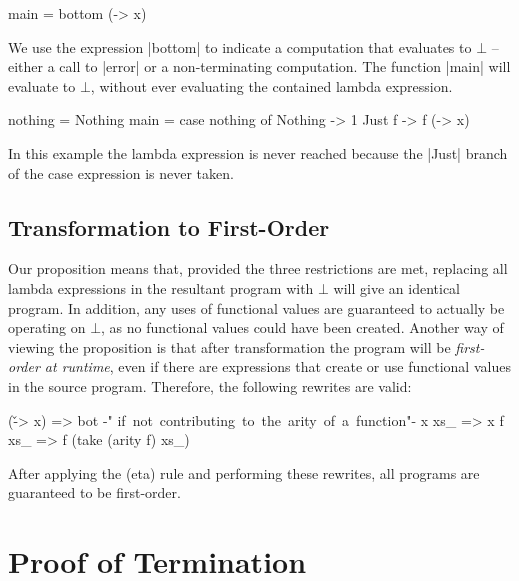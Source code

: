 \documentclass[preprint]{sigplanconf}
\begin{document}
\begin{example}
\begin{code}
main = bottom (\x -> x)
\end{code}

We use the expression |bottom| to indicate a computation that evaluates to $\bot{}$ -- either a call to |error| or a non-terminating computation. The function |main| will evaluate to $\bot{}$, without ever evaluating the contained lambda expression.
\end{example}

\begin{example}
\begin{onepage}
\begin{code}
nothing = Nothing
main = case  nothing of
             Nothing  -> 1
             Just f   -> f (\x -> x)
\end{code}
\end{onepage}

In this example the lambda expression is never reached because the |Just| branch of the case expression is never taken.
\end{example}

\subsection{Transformation to First-Order}
\label{sec:consequences}

Our proposition means that, provided the three restrictions are met, replacing all lambda expressions in the resultant program with $\bot{}$ will give an identical program. In addition, any uses of functional values are guaranteed to actually be operating on $\bot{}$, as no functional values could have been created. Another way of viewing the proposition is that after transformation the program will be \textit{first-order at runtime}, even if there are expressions that create or use functional values in the source program. Therefore, the following rewrites are valid:

\ignore\begin{code}
(\v -> x)  => bot    {-"\hspace{3mm} \hbox{if not contributing to the arity of a function}"-}
x xs_      => x
f xs_      => f (take (arity f) xs_)
\end{code}

After applying the (eta) rule and performing these rewrites, all programs are guaranteed to be first-order.

\section{Proof of Termination}
\label{sec:termination}
\end{document}
